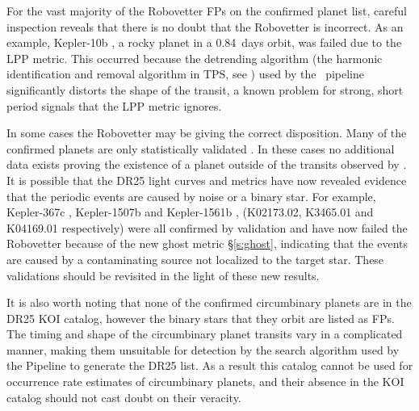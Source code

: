 For the vast majority of the Robovetter FPs on the confirmed planet list, careful inspection reveals that there is no doubt that the Robovetter is incorrect. As an example, Kepler-10b \citep[][]{Batalha2011Kepler10,Fogtmann2014Kepler10}, a rocky planet in a 0.84~days orbit, was failed due to the LPP metric. This occurred because the detrending algorithm (the harmonic identification and removal algorithm in TPS, see \citet{JenkinsKDPH}) used by the \Kepler\ pipeline significantly distorts the shape of the transit, a known problem for strong, short period signals \citep{Christiansen2015} that the LPP metric ignores. 

In some cases the Robovetter may be giving the correct disposition.  Many of the confirmed planets are only statistically validated \citep{Morton2016,Rowe2014}. In these cases no additional data exists proving the existence of a planet outside of the transits observed by \Kepler. It is possible that the DR25 light curves and metrics have now revealed evidence that the periodic events are caused by noise or a binary star. For example, Kepler-367c \citep{Rowe2014}, Kepler-1507b \citep{Morton2016} and Kepler-1561b \citep{Morton2016}, (K02173.02, K3465.01 and K04169.01 respectively) were all confirmed by validation and have now failed the Robovetter because of the new ghost metric \S\ref{s:ghost}, indicating that the events are caused by a contaminating source not localized to the target star.  These validations should be revisited in the light of these new results.

{\color{blue}
It is also worth noting that none of the confirmed circumbinary planets \citep[e.g.,][]{Doyle2011,Orosz2012} are in the DR25 KOI catalog, however the binary stars that they orbit are listed as FPs.  The timing and shape of the circumbinary planet transits vary in a complicated manner, making them unsuitable for detection by the search algorithm used by the \Kepler{} Pipeline to generate the DR25 \opstce{} list.  As a result this catalog cannot be used for occurrence rate estimates of circumbinary planets, and their absence in the KOI catalog should not cast doubt on their veracity. 
}


